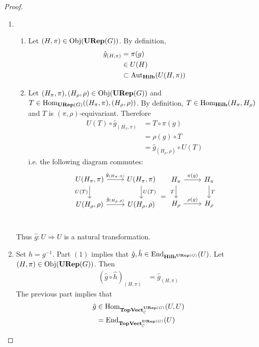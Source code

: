 \documentclass{book}
\begin{document}
	\begin{proof}\
		\begin{enumerate}
			\item \begin{enumerate}
				\item Let $(H, \pi) \in \operatorname{Obj}(\operatorname*{\text{\textbf{URep}}}(G))$. By definition,  
				\begin{align*}
					\hat{g}_{(H, \pi)}
					& = \pi(g) \\
					& \in U(H) \\
					& \subset \operatorname{Aut}_{\operatorname*{\text{\textbf{Hilb}}}}(U(H, \pi))
				\end{align*}
				\item Let $(H_{\pi}, \pi), (H_{\rho}, \rho) \in \operatorname{Obj}(\operatorname*{\text{\textbf{URep}}}(G))$ and $T \in \operatorname{Hom}_{\operatorname*{\text{\textbf{URep}}}(G)}((H_{\pi}, \pi), (H_{\rho}, \rho))$. By definition, $T \in \operatorname{Hom}_{\operatorname*{\text{\textbf{Hilb}}}}(H_{\pi}, H_{\rho})$ and $T$ is $(\pi, \rho)$-equivariant. Therefore
				\begin{align*}
					U(T) \circ \hat{g}_{(H_{\pi}, \pi)}
					& = T \circ \pi(g) \\
					& = \rho(g) \circ T \\
					& = \hat{g}_{(H_{\rho}, \rho)} \circ U(T) 
				\end{align*}
				i.e. the following diagram commutes: 
				\[ 
				\begin{tikzcd}
					U(H_{\pi}, \pi)  \arrow[r, "\hat{g}_{(H_{\pi} ,\pi)}"]  \arrow[d, "U(T)"']  & U(H_{\pi}, \pi)   \arrow[d, "U(T)"]\\
					U(H_{\rho}, \rho) \arrow[r, "\hat{g}_{(H_{\rho}, \rho)}"] &  U(H_{\rho}, \rho) \\
				\end{tikzcd}
				= 
				\begin{tikzcd}
					H_{\pi}  \arrow[r, "\pi(g)"]  \arrow[d, "T"']  & H_{\pi}   \arrow[d, "T"]\\
					H_{\rho} \arrow[r, "\rho(g)"] &  H_{\rho} \\
				\end{tikzcd}
				\]
			\end{enumerate}
			Thus $\hat{g}: U \Rightarrow U$ is a natural transformation. 
			\item Set $h = g^{-1}$. Part $(1)$ implies that $\hat{g}, \hat{h} \in \operatorname{End}_{\operatorname*{\text{\textbf{Hilb}}}^{\operatorname*{\text{\textbf{URep}}}(G)}}(U)$. Let $(H, \pi) \in \operatorname{Obj}(\operatorname*{\text{\textbf{URep}}}(G))$. Then 
			\begin{align*}
				(\hat{g} \circ \hat{h})_{(H, \pi)}
				& = \hat{g}_{(H, \pi)}
			\end{align*}
			The previous part implies that  
			\begin{align*}
				\hat{g} 
				& \in \operatorname{Hom}_{\operatorname*{\text{\textbf{TopVect}}}_{\mathbb{C}}^{\operatorname*{\text{\textbf{URep}}}(G)}}(U, U) \\
				& = \operatorname{\text{End}}_{\operatorname*{\text{\textbf{TopVect}}}_{\mathbb{C}}^{\operatorname*{\text{\textbf{URep}}}(G)}}(U)
			\end{align*} 
		\end{enumerate}
	\end{proof}
	
\end{document}
